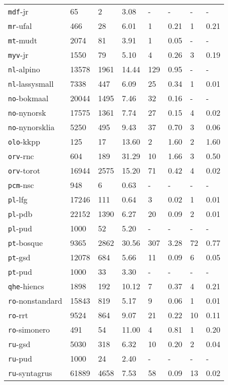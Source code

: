 \begin{longtable}{|l|l|l|l|l|l|l|l|}
\texttt{mdf}-jr & 65 & 2 & 3.08 & - & - & - & -\\
\texttt{mr}-ufal & 466 & 28 & 6.01 & 1 & 0.21 & 1 & 0.21\\
\texttt{mt}-mudt & 2074 & 81 & 3.91 & 1 & 0.05 & - & -\\
\texttt{myv}-jr & 1550 & 79 & 5.10 & 4 & 0.26 & 3 & 0.19\\
\texttt{nl}-alpino & 13578 & 1961 & 14.44 & 129 & 0.95 & - & -\\
\texttt{nl}-lassysmall & 7338 & 447 & 6.09 & 25 & 0.34 & 1 & 0.01\\
\texttt{no}-bokmaal & 20044 & 1495 & 7.46 & 32 & 0.16 & - & -\\
\texttt{no}-nynorsk & 17575 & 1361 & 7.74 & 27 & 0.15 & 4 & 0.02\\
\texttt{no}-nynorsklia & 5250 & 495 & 9.43 & 37 & 0.70 & 3 & 0.06\\
\texttt{olo}-kkpp & 125 & 17 & 13.60 & 2 & 1.60 & 2 & 1.60\\
\texttt{orv}-rnc & 604 & 189 & 31.29 & 10 & 1.66 & 3 & 0.50\\
\texttt{orv}-torot & 16944 & 2575 & 15.20 & 71 & 0.42 & 4 & 0.02\\
\texttt{pcm}-nsc & 948 & 6 & 0.63 & - & - & - & -\\
\texttt{pl}-lfg & 17246 & 111 & 0.64 & 3 & 0.02 & 1 & 0.01\\
\texttt{pl}-pdb & 22152 & 1390 & 6.27 & 20 & 0.09 & 2 & 0.01\\
\texttt{pl}-pud & 1000 & 52 & 5.20 & - & - & - & -\\
\texttt{pt}-bosque & 9365 & 2862 & 30.56 & 307 & 3.28 & 72 & 0.77\\
\texttt{pt}-gsd & 12078 & 684 & 5.66 & 11 & 0.09 & 6 & 0.05\\
\texttt{pt}-pud & 1000 & 33 & 3.30 & - & - & - & -\\
\texttt{qhe}-hiencs & 1898 & 192 & 10.12 & 7 & 0.37 & 4 & 0.21\\
\texttt{ro}-nonstandard & 15843 & 819 & 5.17 & 9 & 0.06 & 1 & 0.01\\
\texttt{ro}-rrt & 9524 & 864 & 9.07 & 21 & 0.22 & 10 & 0.11\\
\texttt{ro}-simonero & 491 & 54 & 11.00 & 4 & 0.81 & 1 & 0.20\\
\texttt{ru}-gsd & 5030 & 318 & 6.32 & 10 & 0.20 & 2 & 0.04\\
\texttt{ru}-pud & 1000 & 24 & 2.40 & - & - & - & -\\
\texttt{ru}-syntagrus & 61889 & 4658 & 7.53 & 58 & 0.09 & 13 & 0.02\\

\end{longtable}
